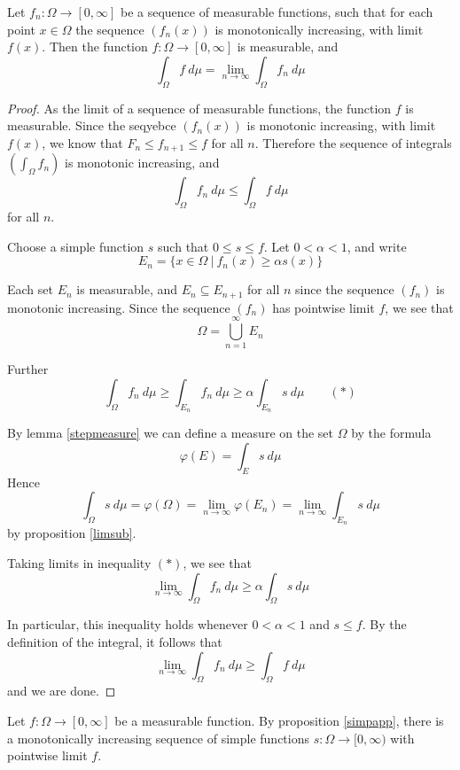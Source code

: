 \begin{theorem}

Let $f_n\colon \Omega \rightarrow [0,\infty ]$ be a sequence of measurable functions, such that for each point $x\in \Omega$ the sequence $(f_n (x))$ is monotonically increasing, with limit $f(x)$.  Then the function $f\colon \Omega \rightarrow [0,\infty ]$ is measurable, and
$$\int_\Omega f\ d\mu = \lim_{n\rightarrow \infty} \int_\Omega f_n \ d\mu$$
\end{theorem}

\begin{proof}
As the limit of a sequence of measurable functions, the function $f$ is measurable.  Since the seqyebce $(f_n (x))$ is monotonic increasing, with limit $f(x)$, we know that $F_n \leq f_{n+1} \leq f$ for all $n$.  Therefore the sequence of integrals $\left( \int_\Omega f_n \right)$ is monotonic increasing, and
$$\int_\Omega f_n \ d\mu \leq \int_\Omega f \ d\mu$$
for all $n$.

Choose a simple function $s$ such that $0\leq s\leq f$.  Let $0<\alpha <1$, and write
$$E_n = \{ x\in \Omega \ |\ f_n (x) \geq \alpha s(x) \}$$

Each set $E_n$ is measurable, and $E_n \subseteq E_{n+1}$ for all $n$ since the sequence $(f_n)$ is monotonic increasing.  Since the sequence $(f_n)$ has pointwise limit $f$, we see that
$$\Omega = \bigcup_{n=1}^\infty E_n$$

Further
$$\int_\Omega f_n\ d\mu \geq \int_{E_n} f_n \ d\mu \geq \alpha \int_{E_n}s\ d\mu \qquad (\ast )$$

By lemma \ref{stepmeasure} we can define a measure on the set $\Omega$ by the formula
$$\varphi (E) = \int_E s\ d\mu$$
Hence
$$\int_\Omega s\ d\mu = \varphi (\Omega ) = \lim_{n\rightarrow \infty} \varphi (E_n ) = \lim_{n\rightarrow \infty} \int_{E_n}s\ d\mu$$
by proposition \ref{limsub}.

Taking limits in inequality $(\ast )$, we see that
$$\lim_{n\rightarrow \infty } \int_\Omega f_n \ d\mu \geq \alpha \int_\Omega s\ d\mu$$

In particular, this inequality holds whenever $0<\alpha <1$ and $s\leq f$.  By the definition of the integral, it follows that
$$\lim_{n\rightarrow \infty}\int_\Omega f_n \ d\mu \geq \int_\Omega f \ d\mu$$
and we are done.
\end{proof}

Let $f\colon \Omega \rightarrow [0,\infty ]$ be a measurable function.  By proposition \ref{simpapp}, there is a monotonically increasing sequence of simple functions $s\colon \Omega \rightarrow [0,\infty )$ with pointwise limit $f$.

